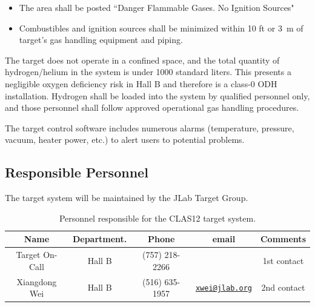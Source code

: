 \begin{itemize}
\item The area shall be posted ``Danger Flammable Gases. No Ignition Sources" 
\item Combustibles and ignition sources shall be minimized within 10 ft or 3~m of target’s gas handling equipment and piping.
\end{itemize}

The target does not operate in a confined space, and the total quantity of hydrogen/helium in the system is under 1000 standard liters. This presents a negligible oxygen deficiency risk in Hall B and therefore is a class-0 ODH installation.  Hydrogen shall be loaded into the system by qualified personnel only, and those personnel shall follow approved operational gas handling procedures.

The target control software includes numerous alarms (temperature, pressure, vacuum, heater power, etc.) to alert users to potential problems.

\subsection{Responsible Personnel}

The target system will be maintained by the JLab Target Group.  

\begin{table}[!htb]
\centering
\begin{tabular}{|c|c|c|c|c|}
\hline
 Name&Department.&Phone&email&Comments \\ \hline
Target On-Call & Hall B &(757) 218-2266& &1st contact \\ \hline
Xiangdong Wei & Hall B &(516) 635-1957&\href{mailto:xwei@jlab.org}{\nolinkurl{xwei@jlab.org}} &2nd contact \\ \hline
\end{tabular}
\caption{Personnel responsible for the CLAS12 target system.} 
\label{tb:target}
\end{table}
